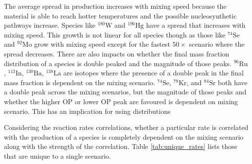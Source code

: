 The average spread in production increases with mixing speed because the material is able to reach hotter temperatures and the possible nucleosynthetic pathways increase.
Species like $^{180}\mathrm{W}$ and $^{196}\mathrm{Hg}$ have a spread that increases with mixing speed.
This growth is not linear for all species though as those like $^{74}\mathrm{Se}$ and $^{92}\mathrm{Mo}$ grow with mixing speed except for the fastest $50\times$ scenario where the spread decreases.
There are also impacts on whether the final mass fraction distribution of a species is double peaked and the magnitude of those peaks.
$^{96}\mathrm{Ru}$, $^{113}\mathrm{In}$, $^{130}\mathrm{Ba}$, $^{138}\mathrm{La}$ are isotopes where the presence of a double peak in the final mass fraction is dependent on the mixing scenario. 
$^{74}\mathrm{Se}$, $^{78}\mathrm{Kr}$, and $^{84}\mathrm{Sr}$ both have a double peak across the mixing scenarios, but the magnitude of those peaks and whether the higher $\mathrm{OP}$ or lower $\mathrm{OP}$ peak are favoured is dependent on mixing scenario.
This has an implication for using distributions

Considering the reaction rates correlations, whether a particular rate is correlated with the production of a species is completely dependent on the mixing scenario along with the strength of the correlation.
Table \ref{tab:unique_rates} lists those that are unique to a single scenario.


